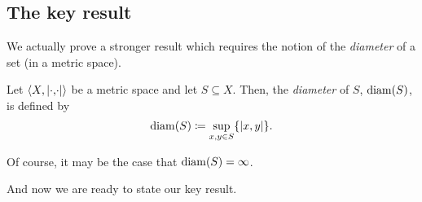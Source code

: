 \subsection{The key result}

We actually prove a stronger result which requires the notion of the \emph{diameter} of a set (in a metric space).
\begin{dfn}[Diameter]\label{Diameter}
Let $\coord{X,\metric}$ be a metric space and let $S\subseteq X$.  Then, the \emph{diameter} of $S$, $\operatorname{diam} (S)$, is defined by
\begin{equation}
\diam (S)\coloneqq \sup _{x,y\in S}\{ \metric[x][y]\} .
\end{equation}
\begin{rmk}
Of course, it may be the case that $\operatorname{diam} (S)=\infty$.
\end{rmk}
\end{dfn}
And now we are ready to state our key result.
